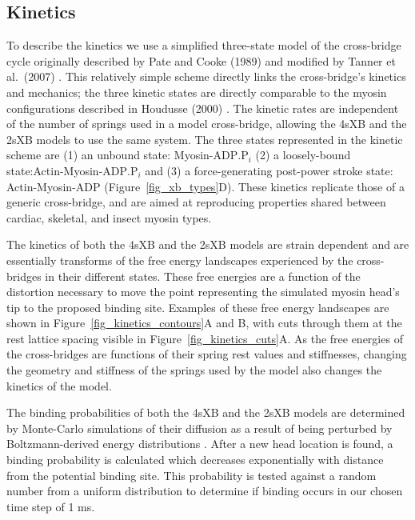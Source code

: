 \documentclass[10pt]{article}
\newcommand{\citep}[1]{\cite{#1}} %
\begin{document}
\subsection*{Kinetics} %

To describe the kinetics we use a simplified three-state model of the cross-bridge cycle originally described by Pate and Cooke (1989) \citep{Pate1989} and modified by Tanner et al.~(2007) \citep{Tanner2007}. 
This relatively simple scheme directly links the cross-bridge's kinetics and mechanics; the three kinetic states are directly comparable to the myosin configurations described in Houdusse (2000) \citep{Houdusse2000}. 
The kinetic rates are independent of the number of springs used in a model cross-bridge, allowing the 4sXB and the 2sXB models to use the same system. 
The three states represented in the kinetic scheme are (1) an unbound state: Myosin-$\mathrm{ADP.P}_i$ (2) a loosely-bound state:Actin-Myosin-$\mathrm{ADP.P}_i$ and (3) a force-generating post-power stroke state: Actin-Myosin-ADP (Figure~\ref{fig_xb_types}D). 
These kinetics replicate those of a generic cross-bridge, and are aimed at reproducing properties shared between cardiac, skeletal, and insect myosin types. 

The kinetics of both the 4sXB and the 2sXB models are strain dependent and are essentially transforms of the free energy landscapes experienced by the cross-bridges in their different states.
These free energies are a function of the distortion necessary to move the point representing the simulated myosin head's tip to the proposed binding site. 
Examples of these free energy landscapes are shown in Figure~\ref{fig_kinetics_contours}A and B, with cuts through them at the rest lattice spacing visible in Figure~\ref{fig_kinetics_cuts}A.
As the free energies of the cross-bridges are functions of their spring rest values and stiffnesses, changing the geometry and stiffness of the springs used by the model also changes the kinetics of the model. 

The binding probabilities of both the 4sXB and the 2sXB models are determined by Monte-Carlo simulations of their diffusion as a result of being perturbed by Boltzmann-derived energy distributions \citep{DillBook}. 
After a new head location is found, a binding probability is calculated which decreases exponentially with distance from the potential binding site. 
This probability is tested against a random number from a uniform distribution to determine if binding occurs in our chosen time step of 1 ms.
\end{document}
